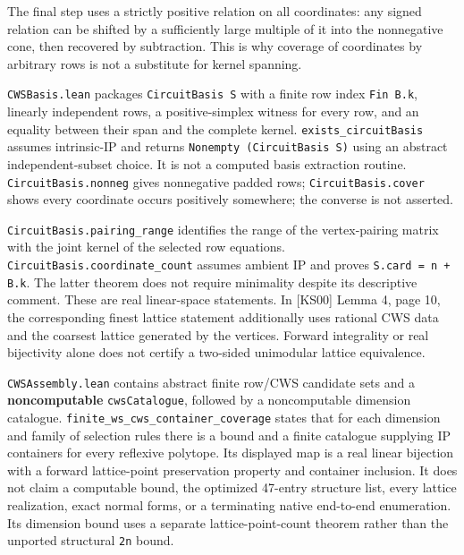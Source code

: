 \documentclass[11pt,a4paper,oneside]{report}
\begin{document}
The final step uses a strictly positive relation on all coordinates: any
signed relation can be shifted by a sufficiently large multiple of it
into the nonnegative cone, then recovered by subtraction. This is why
coverage of coordinates by arbitrary rows is not a substitute for kernel
spanning.

\texttt{CWSBasis\allowbreak{}.\allowbreak{}lean} packages
\texttt{CircuitB\allowbreak{}asis S} with a finite row index
\texttt{Fin B.\allowbreak{}k}, linearly independent rows, a
positive-simplex witness for every row, and an equality between their
span and the complete kernel.
\texttt{exists\_\allowbreak{}circuitB\allowbreak{}asis} assumes
intrinsic-IP and returns
\texttt{Nonempty\allowbreak{} (\allowbreak{}CircuitB\allowbreak{}asis S)}
using an abstract independent-subset choice. It is not a computed basis
extraction routine.
\texttt{CircuitB\allowbreak{}asis.\allowbreak{}nonneg} gives nonnegative
padded rows; \texttt{CircuitB\allowbreak{}asis.\allowbreak{}cover} shows
every coordinate occurs positively somewhere; the converse is not
asserted.

\texttt{CircuitB\allowbreak{}asis.\allowbreak{}pairing\_\allowbreak{}range}
identifies the range of the vertex-pairing matrix with the joint kernel
of the selected row equations.
\texttt{CircuitB\allowbreak{}asis.\allowbreak{}coordina\allowbreak{}te\_\allowbreak{}count}
assumes ambient IP and proves
\texttt{S.\allowbreak{}card =\allowbreak{} n + B.\allowbreak{}k}. The
latter theorem does not require minimality despite its descriptive
comment. These are real linear-space statements. In {[}KS00{]} Lemma 4,
page 10, the corresponding finest lattice statement additionally uses
rational CWS data and the coarsest lattice generated by the vertices.
Forward integrality or real bijectivity alone does not certify a
two-sided unimodular lattice equivalence.

\texttt{CWSAssem\allowbreak{}bly.\allowbreak{}lean} contains abstract
finite row/CWS candidate sets and a \textbf{noncomputable}
\texttt{cwsCatal\allowbreak{}ogue}, followed by a noncomputable
dimension catalogue.
\texttt{finite\_\allowbreak{}ws\_\allowbreak{}cws\_\allowbreak{}containe\allowbreak{}r\_\allowbreak{}coverage}
states that for each dimension and family of selection rules there is a
bound and a finite catalogue supplying IP containers for every reflexive
polytope. Its displayed map is a real linear bijection with a forward
lattice-point preservation property and container inclusion. It does not
claim a computable bound, the optimized 47-entry structure list, every
lattice realization, exact normal forms, or a terminating native
end-to-end enumeration. Its dimension bound uses a separate
lattice-point-count theorem rather than the unported structural
\texttt{2n} bound.
\end{document}
